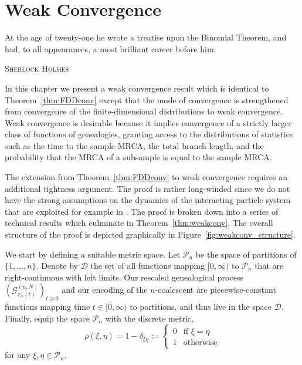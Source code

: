 \chapter{Weak Convergence} %
\label{ch:weakconv}

\epigraph{
At the age of twenty-one he wrote a treatise upon the Binomial Theorem, %
and had, to all appearances, a most brilliant career before him.
}
{\textsc{Sherlock Holmes}} %

In this chapter we present a weak convergence result which is identical to Theorem~\ref{thm:FDDconv} except that the mode of convergence is strengthened from convergence of the finite-dimensional distributions to weak convergence. 
Weak convergence is desirable because it implies convergence of a strictly larger class of functions of genealogies, granting access to the distributions of statistics such as the time to the sample MRCA, the total branch length, and the probability that the MRCA of a subsample is equal to the sample MRCA.

The extension from Theorem~\ref{thm:FDDconv} to weak convergence requires an additional tightness argument. The proof is rather long-winded since we do not have the strong assumptions on the dynamics of the interacting particle system that are exploited for example in \textcite{mohle1999}. The proof is broken down into a series of technical results which culminate in Theorem~\ref{thm:weakconv}. The overall structure of the proof is depicted graphically in Figure~\ref{fig:weakconv_structure}.


We start by defining a suitable metric space.
Let $\mathcal{P}_n$ be the space of partitions of $\{1,\dots,n\}$.
Denote by $\mathcal{D}$ the set of all functions mapping $[0,\infty)$ to $\mathcal{P}_n$ that are right-continuous with left limits.
Our rescaled genealogical process $(\mathcal{G}^{(n,N)}_{\tau_N(t)})_{t\geq0}$ and our encoding of the $n$-coalescent are piecewise-constant functions mapping time $t\in[0,\infty)$ to partitions, and thus live in the space $\mathcal{D}$.
Finally, equip the space $\mathcal{P}_n$ with the discrete metric,
\begin{equation*}
\rho(\xi,\eta) 
= 1- \delta_{\xi\eta} 
:= \begin{cases}
    0 &\text{if } \xi=\eta \\
    1 &\text{otherwise}
\end{cases}
\end{equation*}
for any $\xi, \eta \in \mathcal{P}_n$.


